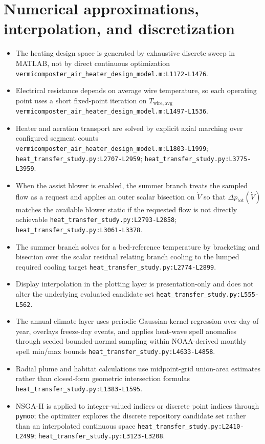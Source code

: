 \documentclass[11pt]{article}
\newcommand{\srcref}[1]{\nolinkurl{#1}}
\begin{document}
\section{Numerical approximations, interpolation, and discretization}
\begin{itemize}[leftmargin=*]
\item The heating design space is generated by exhaustive discrete sweep in MATLAB, not by direct continuous optimization \srcref{vermicomposter_air_heater_design_model.m:L1172-L1476}.
\item Electrical resistance depends on average wire temperature, so each operating point uses a short fixed-point iteration on \(T_{\mathrm{wire,avg}}\) \srcref{vermicomposter_air_heater_design_model.m:L1497-L1536}.
\item Heater and aeration transport are solved by explicit axial marching over configured segment counts \srcref{vermicomposter_air_heater_design_model.m:L1803-L1999}; \srcref{heat_transfer_study.py:L2707-L2959}; \srcref{heat_transfer_study.py:L3775-L3959}.
\item When the assist blower is enabled, the summer branch treats the sampled flow as a request and applies an outer scalar bisection on \(\dot V\) so that \(\Delta p_{\mathrm{tot}}(\dot V)\) matches the available blower static if the requested flow is not directly achievable \srcref{heat_transfer_study.py:L2793-L2858}; \srcref{heat_transfer_study.py:L3061-L3378}.
\item The summer branch solves for a bed-reference temperature by bracketing and bisection over the scalar residual relating branch cooling to the lumped required cooling target \srcref{heat_transfer_study.py:L2774-L2899}.
\item Display interpolation in the plotting layer is presentation-only and does not alter the underlying evaluated candidate set \srcref{heat_transfer_study.py:L555-L562}.
\item The annual climate layer uses periodic Gaussian-kernel regression over day-of-year, overlays freeze-day events, and applies heat-wave spell anomalies through seeded bounded-normal sampling within NOAA-derived monthly spell min/max bounds \srcref{heat_transfer_study.py:L4633-L4858}.
\item Radial plume and habitat calculations use midpoint-grid union-area estimates rather than closed-form geometric intersection formulas \srcref{heat_transfer_study.py:L1383-L1595}.
\item NSGA-II is applied to integer-valued indices or discrete point indices through \texttt{pymoo}; the optimizer explores the discrete repository candidate set rather than an interpolated continuous space \srcref{heat_transfer_study.py:L2410-L2499}; \srcref{heat_transfer_study.py:L3123-L3208}.
\end{itemize}
\end{document}
